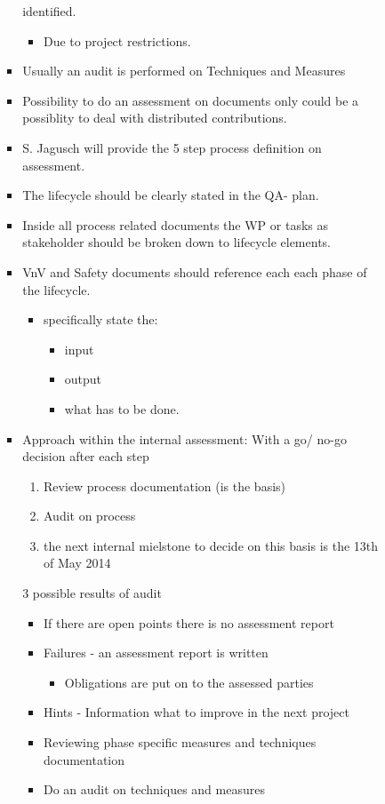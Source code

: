 \documentclass[a4paper,german]{article}
\begin{document}
\begin{enumerate}
\begin{itemize}
\begin{itemize}
\begin{itemize}
             identified.
\begin{itemize}
\item Due to project restrictions.
\end{itemize}
\item Usually an audit is performed on Techniques and Measures
\item Possibility to do an assessment on documents only could be a possiblity 
             to deal with distributed contributions.
\item S. Jagusch will provide the 5 step process definition on assessment.
\item The lifecycle should be clearly stated in the QA- plan.
\item Inside all process related documents the WP or tasks as
             stakeholder should be broken down to lifecycle elements.
\item VnV and Safety documents should reference each each phase of the lifecycle.
\begin{itemize}
\item specifically state the:
\begin{itemize}
\item input
\item output
\item what has to be done.
\end{itemize}
\end{itemize}
\item Approach within the internal assessment:
             With a go/ no-go decision after each step
\begin{enumerate}
\item Review process documentation (is the basis)
\item Audit on process
\item the next internal mielstone to decide on this basis is the 13th of May 2014
\end{enumerate}
3 possible results of audit
\begin{itemize}
\item If there are open points there is no assessment report
\item Failures - an assessment report is written
\begin{itemize}
\item Obligations are put on to the assessed parties
\end{itemize}
\item Hints - Information what to improve in the next project
\item Reviewing phase specific measures and techniques documentation
\item Do an audit on techniques and measures
\end{itemize}
\end{itemize}
\end{itemize}
\end{itemize}
\end{enumerate}
\end{document}
